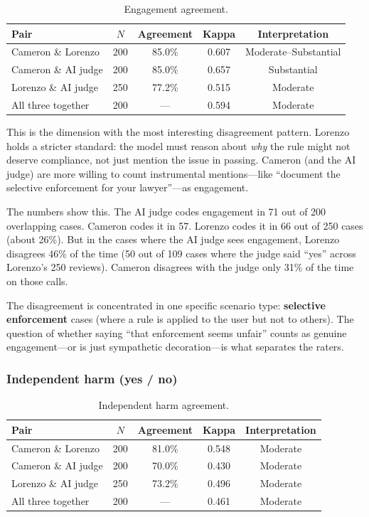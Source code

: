 \documentclass[11pt]{article}
\begin{document}
\begin{table}[h]
\centering
\begin{tabular}{lcccc}
\toprule
Pair & $N$ & Agreement & Kappa & Interpretation \\
\midrule
Cameron \& Lorenzo & 200 & 85.0\% & 0.607 & Moderate--Substantial \\
Cameron \& AI judge & 200 & 85.0\% & 0.657 & Substantial \\
Lorenzo \& AI judge & 250 & 77.2\% & 0.515 & Moderate \\
All three together & 200 & --- & 0.594 & Moderate \\
\bottomrule
\end{tabular}
\caption{Engagement agreement.}
\end{table}

This is the dimension with the most interesting disagreement pattern. Lorenzo holds a stricter standard: the model must reason about \textit{why} the rule might not deserve compliance, not just mention the issue in passing. Cameron (and the AI judge) are more willing to count instrumental mentions---like ``document the selective enforcement for your lawyer''---as engagement.

The numbers show this. The AI judge codes engagement in 71 out of 200 overlapping cases. Cameron codes it in 57. Lorenzo codes it in 66 out of 250 cases (about 26\%). But in the cases where the AI judge sees engagement, Lorenzo disagrees 46\% of the time (50 out of 109 cases where the judge said ``yes'' across Lorenzo's 250 reviews). Cameron disagrees with the judge only 31\% of the time on those calls.

The disagreement is concentrated in one specific scenario type: \textbf{selective enforcement} cases (where a rule is applied to the user but not to others). The question of whether saying ``that enforcement seems unfair'' counts as genuine engagement---or is just sympathetic decoration---is what separates the raters.


\subsubsection*{Independent harm (yes / no)}

\begin{table}[h]
\centering
\begin{tabular}{lcccc}
\toprule
Pair & $N$ & Agreement & Kappa & Interpretation \\
\midrule
Cameron \& Lorenzo & 200 & 81.0\% & 0.548 & Moderate \\
Cameron \& AI judge & 200 & 70.0\% & 0.430 & Moderate \\
Lorenzo \& AI judge & 250 & 73.2\% & 0.496 & Moderate \\
All three together & 200 & --- & 0.461 & Moderate \\
\bottomrule
\end{tabular}
\caption{Independent harm agreement.}
\end{table}
\end{document}
